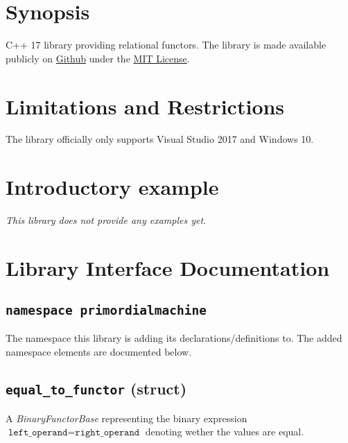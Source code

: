 \documentclass[oneside]{book}
\begin{document}
\frontmatter

\begin{titlepage}
\maketitle
\end{titlepage}

\tableofcontents
{}

\mainmatter

\chapter{Synopsis}
C++ 17 library providing relational functors.
The library is made available publicly on
\href{\GetLibraryRepository}{Github}
under the
\href{\GetLibraryRepository/blob/master/LICENSE}{MIT License}.

\chapter{Limitations and Restrictions}
The library officially only supports Visual Studio 2017 and Windows 10.

\chapter{Introductory example}
\textit{\color{orange}This library does not provide any examples yet.}



\chapter{Library Interface Documentation}

\section{\texttt{namespace primordialmachine}}
The namespace this library is adding its declarations/definitions to.
The added namespace elements are documented below.



\section{\texttt{equal\_to\_functor} (struct)}
A \textit{BinaryFunctorBase} representing the binary expression
$\texttt{left\_operand} = \texttt{right\_operand}$
denoting wether the values are equal.\newline
\end{document}
